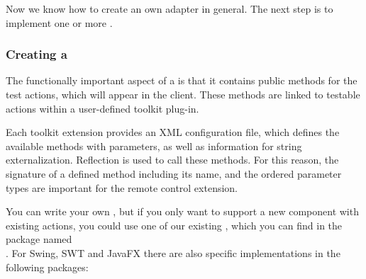 Now we know how to create an own adapter in general. The next step is to
implement one or more \gdtesterclass. 

\subsubsection{Creating a \gdtesterclass}

The functionally important aspect of a \gdtesterclass is that it
contains public methods for the test actions, which will appear in
the client. These methods are linked to testable actions within a user-defined
\ite{} toolkit plug-in.

Each \ite{}  toolkit extension provides an XML configuration file, which defines the
available methods with parameters, as well as information for string
externalization. Reflection is used to call these methods. For this reason, the
signature of a defined method including its name, and the ordered parameter
types are important for the remote control extension.

You can write your own \gdtesterclasses, but if you only want to support a new
component with existing actions, you could use one of our existing
\gdtesterclasses, which you can find in the package named\\
. For Swing, SWT and JavaFX there are also
specific implementations in the following packages:\\
\\
\\

